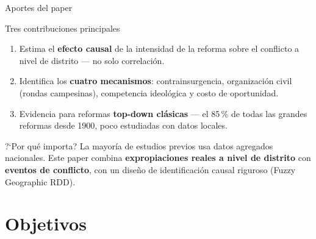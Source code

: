 \documentclass[aspectratio=169,t]{beamer}
\newcommand{\hl}[1]{\textcolor{azulmedio}{\textbf{#1}}}
\begin{document}
\begin{frame}{Aportes del paper}
\begin{block}{Tres contribuciones principales}
\small\begin{enumerate}
  \item Estima el \hl{efecto causal} de la intensidad
        de la reforma sobre el conflicto a nivel de
        distrito --- no solo correlaci\'on.
  \item Identifica los \hl{cuatro mecanismos}:
        contrainsurgencia, organizaci\'on civil
        (rondas campesinas), competencia ideol\'ogica
        y costo de oportunidad.
  \item Evidencia para reformas \hl{top-down cl\'asicas}
        --- el 85\,\% de todas las grandes reformas desde
        1900, poco estudiadas con datos locales.
\end{enumerate}
\end{block}
\vspace{0.2cm}
\begin{alertblock}{?`Por qu\'e importa?}
\small La mayor\'ia de estudios previos usa datos
agregados nacionales. Este paper combina
\textbf{expropiaciones reales a nivel de distrito}
con \textbf{eventos de conflicto}, con un dise\~no
de identificaci\'on causal riguroso
(Fuzzy Geographic RDD).
\end{alertblock}
\end{frame}

\section{Objetivos}
\end{document}
